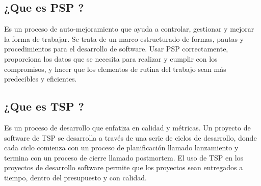 \documentclass[twoside,twocolumn]{article}
\begin{document}
\subsection{¿Que es  PSP  ?}
Es un proceso de auto-mejoramiento que ayuda a controlar, gestionar y mejorar la forma de trabajar. Se trata de un marco estructurado de formas, pautas y procedimientos para el desarrollo de software. 
Usar PSP correctamente, proporciona los datos que se necesita para realizar y cumplir con los compromisos, y hacer que los elementos de rutina del trabajo sean más predecibles y eficientes. 

\subsection{¿Que es TSP ?}
Es un proceso de desarrollo que enfatiza en calidad y métricas. Un proyecto de software de TSP se desarrolla a través de una serie de ciclos de desarrollo, donde cada ciclo comienza con un proceso de planificación llamado lanzamiento y termina con un proceso de cierre llamado postmortem. El uso de TSP en los proyectos de desarrollo software permite que los proyectos sean entregados a tiempo, dentro del presupuesto y con calidad.
\end{document}
